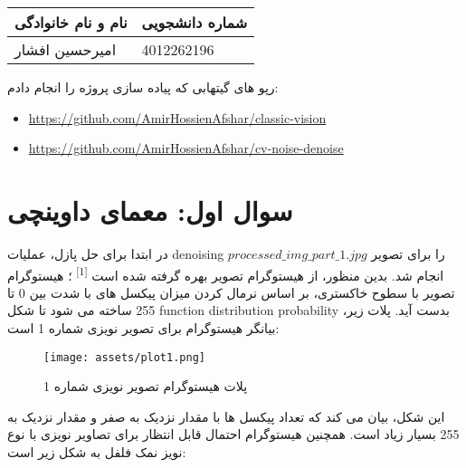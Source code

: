 \documentclass[a4paper,12pt]{article}
\begin{document}
	
	\begin{table}[h]
		\centering
		\begin{tabular}{|l|l|}
			\hline
			\textbf{نام و نام خانوادگی} & \textbf{شماره دانشجویی} \\
			\hline
			امیرحسین افشار & 4012262196 \\
			\hline
		\end{tabular}
	\end{table}
	
	رپو های گیتهابی که پیاده سازی پروژه را انجام دادم:
	\begin{latin}
		\begin{itemize}
			\item \href{https://github.com/AmirHossienAfshar/classic-vision}{https://github.com/AmirHossienAfshar/classic-vision}
			
			\item \href{https://github.com/AmirHossienAfshar/cv-noise-denoise}{https://github.com/AmirHossienAfshar/cv-noise-denoise}
		\end{itemize}
	\end{latin}
	
\hline

	
	\section{سوال اول: معمای داوینچی}
	 در ابتدا برای حل پازل، عملیات denoising را برای تصویر
$processed\_img\_part\_1.jpg$
انجام شد. بدین منظور، از هیستوگرام تصویر بهره گرفته شده است \textsuperscript{[1]} ؛ هیستوگرام تصویر با سطوح خاکستری، بر اساس نرمال کردن میزان پیکسل های با شدت بین 0 تا 255 ساخته می شود تا شکل 
function distribution probability
بدست آید.
 پلات زیر، بیانگر هیستوگرام برای تصویر نویزی شماره 1 است:

\begin{figure}[h]
		\centering
		\texttt{[image: assets/plot1.png]}
		\caption{\textcolor{CustomAccent}{پلات هیستوگرام تصویر نویزی شماره 1}}
	\end{figure}
	
	این شکل، بیان می کند که تعداد پیکسل ها با مقدار نزدیک به صفر و مقدار نزدیک به 255 بسیار زیاد است. همچنین هیستوگرام احتمال قابل انتظار برای تصاویر نویزی با نوع نویز نمک فلفل به شکل زیر است:
	
\end{document}

